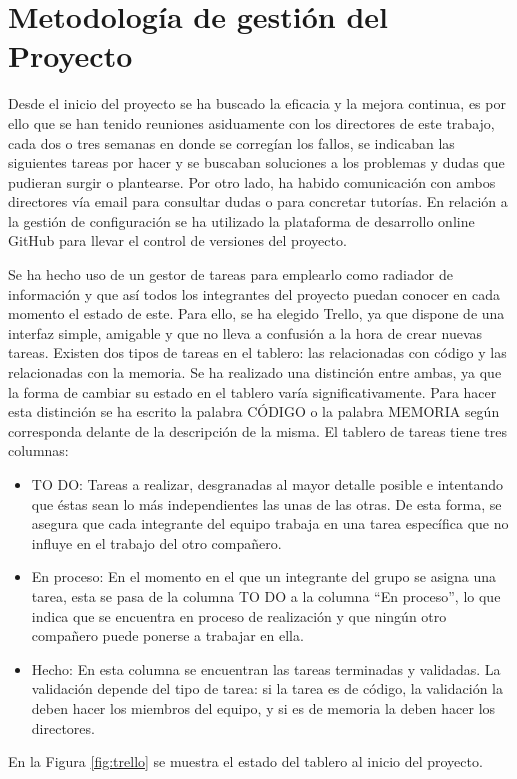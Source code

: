 \chapter{Metodología de gestión del Proyecto}
\label{cap:gestionProyecto}

Desde el inicio del proyecto se ha buscado la eficacia y la mejora continua, es por ello que se han tenido reuniones asiduamente con los directores de este trabajo, cada dos o tres semanas en donde se corregían los fallos, se indicaban las siguientes tareas por hacer y se buscaban soluciones a los problemas y dudas que pudieran surgir o plantearse.
Por otro lado, ha habido comunicación con ambos directores vía email para consultar dudas o para concretar tutorías. En relación a la gestión de configuración se ha utilizado la plataforma de desarrollo online GitHub para llevar el control de versiones del proyecto.

Se ha hecho uso de un gestor de tareas para emplearlo como radiador de información y que así todos los integrantes del proyecto puedan conocer en cada momento el estado de este. Para ello, se ha elegido Trello, ya que dispone de una interfaz simple, amigable y que no lleva a confusión a la hora de crear nuevas tareas.
Existen dos tipos de tareas en el tablero: las relacionadas con código y las relacionadas con la memoria. Se ha realizado una distinción entre ambas, ya que la forma de cambiar su estado en el tablero varía significativamente. Para hacer esta distinción se ha escrito la palabra CÓDIGO o la palabra MEMORIA según corresponda delante de la descripción de la misma. El tablero de tareas tiene tres columnas:
\begin{itemize}
	\item TO DO: Tareas a realizar, desgranadas al mayor detalle posible e intentando que éstas sean lo más independientes las unas de las otras. De esta forma, se asegura que cada integrante del equipo trabaja en una tarea específica que no influye en el trabajo del otro compañero.
	\item En proceso: En el momento en el que un integrante del grupo se asigna una tarea, esta se pasa de la columna TO DO a la columna ``En proceso'', lo que indica que se encuentra en proceso de realización y que ningún otro compañero puede ponerse a trabajar en ella. 
	\item Hecho: En esta columna se encuentran las tareas terminadas y validadas. La validación depende del tipo de tarea: si la tarea es de código, la validación la deben hacer los miembros del equipo, y si es de memoria la deben hacer los directores.
	
\end{itemize}

En la Figura \ref{fig:trello} se muestra el estado del tablero al inicio del proyecto.


